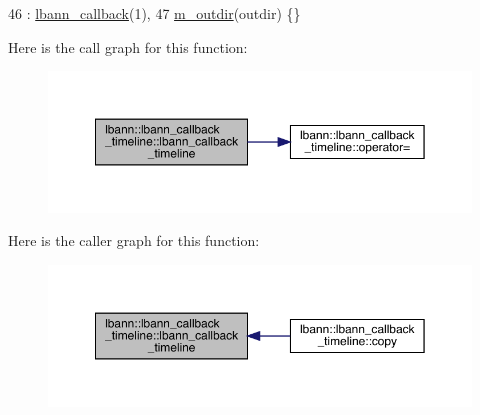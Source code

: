\begin{DoxyCode}
46                                             : \hyperlink{classlbann_1_1lbann__callback_a679057298a41ddd47f08c157f756c584}{lbann\_callback}(1),
47                                                 \hyperlink{classlbann_1_1lbann__callback__timeline_afb064216a569f0763b2fff4ab5547790}{m\_outdir}(outdir) \{\}
\end{DoxyCode}
Here is the call graph for this function\+:\nopagebreak
\begin{figure}[H]
\begin{center}
\leavevmode
\includegraphics[width=350pt]{classlbann_1_1lbann__callback__timeline_a51afde4e9dbd97ecb1d40071df16fb78_cgraph}
\end{center}
\end{figure}
Here is the caller graph for this function\+:\nopagebreak
\begin{figure}[H]
\begin{center}
\leavevmode
\includegraphics[width=350pt]{classlbann_1_1lbann__callback__timeline_a51afde4e9dbd97ecb1d40071df16fb78_icgraph}
\end{center}
\end{figure}
\mbox{\label{classlbann_1_1lbann__callback__timeline_a01188f27525f2f9cc4cbf279368ec827}} 
